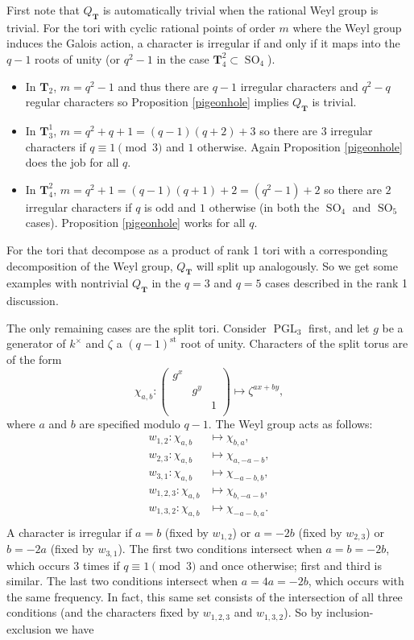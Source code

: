 \documentclass[11pt]{amsart}
\theoremstyle{plain}
\theoremstyle{definition}
\DeclareMathOperator{\PGL}{PGL}
\DeclareMathOperator{\SO}{SO}
\newcommand{\T}{\mathbf{T}}
\begin{document}
First note that $Q_{\T}$ is automatically trivial when the rational Weyl group is trivial.  For the tori with cyclic rational points of order $m$ where the Weyl group induces the Galois action, a character is irregular if and only if it maps into the $q-1$ roots of unity (or $q^2-1$ in the case $\T_4^2 \subset \SO_4$).
\begin{itemize}
\item In $\T_2$, $m=q^2 - 1$ and thus there are $q-1$ irregular characters and $q^2 - q$ regular characters so Proposition \ref{pigeonhole} implies $Q_{\T}$ is trivial.
\item In $\T_3^1$, $m = q^2 + q + 1 = (q - 1)(q + 2) + 3$ so there are $3$ irregular characters if $q \equiv 1 \pmod{3}$ and $1$ otherwise.  Again Proposition \ref{pigeonhole} does the job for all $q$.
\item In $\T_4^2$, $m = q^2 + 1 = (q-1)(q+1) + 2 = (q^2 - 1) + 2$ so there are $2$ irregular characters if $q$ is odd and $1$ otherwise (in both the $\SO_4$ and $\SO_5$ cases).  Proposition \ref{pigeonhole} works for all $q$.
\end{itemize}

For the tori that decompose as a product of rank 1 tori with a corresponding decomposition of the Weyl group, $Q_{\T}$ will split up analogously.  So we get some examples with nontrivial $Q_{\T}$ in the $q=3$ and $q=5$ cases described in the rank 1 discussion.

The only remaining cases are the split tori.  Consider $\PGL_3$ first, and let $g$ be a generator of $k^\times$ and $\zeta$ a $(q-1)^{\mathrm{st}}$ root of unity.  Characters of the split torus are of the form
$$\chi_{a, b} \colon \begin{pmatrix}
g^x & & \\
& g^y & \\
& & 1 \\
\end{pmatrix}
\mapsto \zeta^{ax + by},$$
where $a$ and $b$ are specified modulo $q-1$.  The Weyl group acts as follows:
\begin{align*}
w_{1,2}: \chi_{a,b} &\mapsto \chi_{b, a}, \\
w_{2,3}: \chi_{a,b} &\mapsto \chi_{a,-a-b}, \\
w_{3,1}: \chi_{a,b} &\mapsto \chi_{-a-b,b}, \\
w_{1,2,3}: \chi_{a,b} &\mapsto \chi_{b,-a-b}, \\
w_{1,3,2}: \chi_{a,b} &\mapsto \chi_{-a-b,a}. \\
\end{align*}
A character is irregular if $a=b$ (fixed by $w_{1,2}$) or $a = -2b$ (fixed by $w_{2,3}$) or $b = -2a$ (fixed by $w_{3,1}$).  The first two conditions intersect when $a = b = -2b$, which occurs $3$ times if $q \equiv 1 \pmod{3}$ and once otherwise; first and third is similar.  The last two conditions intersect when $a = 4a = -2b$, which occurs with the same frequency.  In fact, this same set consists of the intersection of all three conditions (and the characters fixed by $w_{1,2,3}$ and $w_{1,3,2}$).  So by inclusion-exclusion we have
\end{document}
